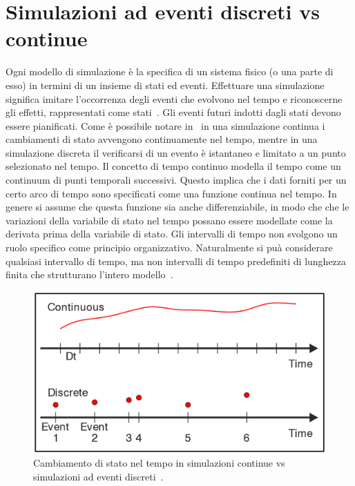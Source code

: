 \documentclass[12pt,a4paper,openright,twoside]{book}
\begin{document}
\section{Simulazioni ad eventi discreti vs continue}
Ogni modello di simulazione è la specifica di un sistema fisico (o una parte di esso) in termini di un insieme di stati ed eventi. 
Effettuare una simulazione significa imitare l'occorrenza degli eventi che evolvono nel tempo e riconoscerne gli effetti, rappresentati come stati~\cite{PDES}. 
Gli eventi futuri indotti dagli stati devono essere pianificati. Come è possibile notare in~ in una simulazione continua i cambiamenti di stato avvengono continuamente nel tempo, mentre in una simulazione discreta il verificarsi di un evento è istantaneo e limitato a un punto selezionato nel tempo. 
Il concetto di tempo continuo modella il tempo come un continuum di punti temporali successivi. Questo implica che i dati forniti per un certo arco di tempo sono specificati come una funzione continua nel tempo. In genere si assume che questa funzione sia anche differenziabile, in modo che che le variazioni della variabile di stato nel tempo possano essere modellate come la derivata prima della variabile di stato. Gli intervalli di tempo non svolgono un ruolo specifico come principio organizzativo. Naturalmente si puà considerare qualsiasi intervallo di tempo, ma non intervalli di tempo predefiniti di lunghezza finita che strutturano l'intero modello~\cite{Ossimitz2008TheBO}. 
\begin{figure}
    \centering
    \includegraphics[width=.8\linewidth]{figures/discrete-event-simulation/Discrete-vs-Continuous-Simulation.png}
    \caption{Cambiamento di stato nel tempo in simulazioni continue vs simulazioni ad eventi discreti~\cite{Helal2008AHS}.}
    \label{fig:Continuous-vs-Discrete}
\end{figure}
\end{document}

